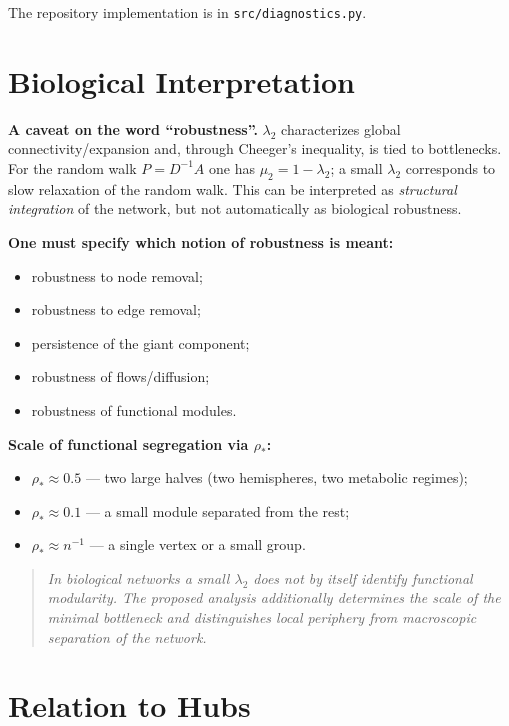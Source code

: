 \documentclass[11pt,a4paper]{article}
\theoremstyle{plain}
\theoremstyle{definition}
\theoremstyle{remark}
\newcommand{\lamtwo}{\lambda_2}
\begin{document}
The repository implementation is in \texttt{src/diagnostics.py}.

\section{Biological Interpretation}
\label{sec:bio}

\textbf{A caveat on the word ``robustness''.} $\lamtwo$ characterizes global
connectivity/expansion and, through Cheeger's inequality, is tied to
bottlenecks. For the random walk $P=D^{-1}A$ one has $\mu_2=1-\lamtwo$; a small
$\lamtwo$ corresponds to slow relaxation of the random walk. This can be
interpreted as \emph{structural integration} of the network, but not
automatically as biological robustness.

\textbf{One must specify which notion of robustness is meant:}
\begin{itemize}[leftmargin=*]
\item robustness to node removal;
\item robustness to edge removal;
\item persistence of the giant component;
\item robustness of flows/diffusion;
\item robustness of functional modules.
\end{itemize}

\textbf{Scale of functional segregation via $\rho_*$:}
\begin{itemize}[leftmargin=*]
\item $\rho_*\approx 0.5$ --- two large halves (two hemispheres, two metabolic
regimes);
\item $\rho_*\approx 0.1$ --- a small module separated from the rest;
\item $\rho_*\approx n^{-1}$ --- a single vertex or a small group.
\end{itemize}

\begin{quote}
\itshape
In biological networks a small $\lamtwo$ does not by itself identify functional
modularity. The proposed analysis additionally determines the scale of the
minimal bottleneck and distinguishes local periphery from macroscopic
separation of the network.
\end{quote}

\section{Relation to Hubs}
\label{sec:hubs}
\end{document}
